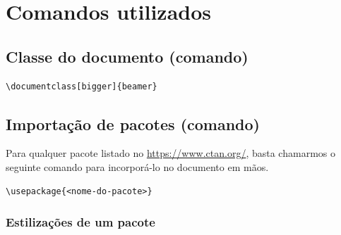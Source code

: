 \documentclass[11pt]{article}
\date{\today}
\title{}
\begin{document}
\tableofcontents


\section{Comandos utilizados}
\label{sec:org874db36}
\subsection{Classe do documento (comando)}
\label{sec:orgc639ab2}
\begin{verbatim}
\documentclass[bigger]{beamer}
\end{verbatim}

\subsection{Importação de pacotes (comando)}
\label{sec:orgd71a6cf}

Para qualquer pacote listado no \url{https://www.ctan.org/}, basta chamarmos
o seguinte comando para incorporá-lo no documento em mãos.

\begin{verbatim}
\usepackage{<nome-do-pacote>}
\end{verbatim}

\subsubsection{Estilizações de um pacote}
\label{sec:orgd8521ed}
\end{document}
